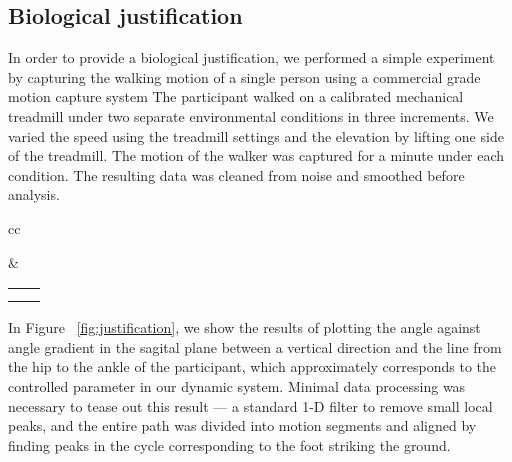 \subsection{Biological justification}
In order to provide a biological justification, we performed a simple experiment by capturing the walking motion of a single person using a commercial grade motion capture system
The participant walked on a calibrated mechanical treadmill under two separate environmental conditions in three increments. 
We varied the speed using the treadmill settings and the elevation by lifting one side of the treadmill. 
The motion of the walker was captured for a minute under each condition. 
The resulting data was cleaned from noise and smoothed before analysis.
\begin{figure*}[htbp]
\centering
\begin{tabular}{cc}
\begin{minipage}{0.2\linewidth}
\end{minipage}&
\begin{minipage}{0.8\linewidth}
\begin{tabular}{cc}\hspace{0.0cm}
  \subfigure[Speed change]{\resizebox{!}{3.2cm}{\texttt{[image: ankle\_timescale]}}}&
  \subfigure[Mean speed cycle]{\resizebox{!}{3.2cm}{\texttt{[image: mean\_ankle\_timescale]}}}\\
  \subfigure[Elevation change]{\resizebox{!}{3.2cm}{\texttt{[image: ankle\_elevation]}}}&
  \subfigure[Mean elevation cycle]{\resizebox{!}{3.2cm}{\texttt{[image: mean\_ankle\_elevation]}}} 
\end{tabular}
\end{minipage}
\end{tabular}
\caption[Biological justification]{\label{fig:justification}On the phase plot, we can demonstrate how a real human adjusts to changes in the environment. The red, green and blue lines represent data captured under different elevation or speed conditions. $q$ is the angle in radians between an orthogonal to the horizon and the line from the hip to the ankle of one leg.}
\end{figure*}
In Figure ~\ref{fig:justification},  we show the results of plotting the angle against angle gradient in the sagital plane between a vertical direction and the line from the hip to the ankle of the participant, which approximately corresponds to the controlled parameter in our dynamic system. 
Minimal data processing was necessary to tease out this result — a standard 1-D filter to remove small local peaks, and the entire path was divided into motion segments and aligned by finding peaks in the cycle corresponding to the foot striking the ground.

